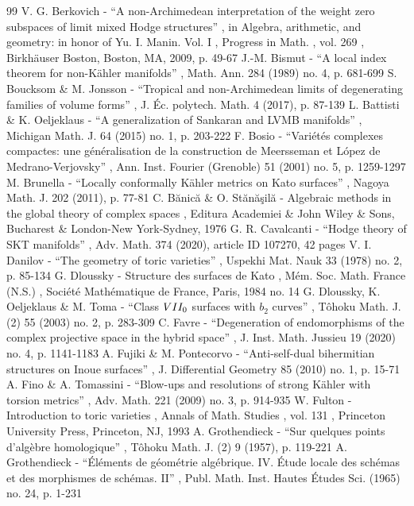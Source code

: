 \documentclass[11pt]{article}
\theoremstyle{definition}
\begin{document}
\begin{thebibliography}{99}
 V. G. Berkovich - “A non-Archimedean interpretation of the weight zero subspaces of limit mixed Hodge structures” , in Algebra, arithmetic, and geometry: in honor of Yu. I. Manin. Vol. I , Progress in Math. , vol. 269 , Birkhäuser Boston, Boston, MA, 2009, p. 49-67
 J.-M. Bismut - “A local index theorem for non-Kähler manifolds” , Math. Ann. 284 (1989) no. 4, p. 681-699
 S. Boucksom \& M. Jonsson - “Tropical and non-Archimedean limits of degenerating families of volume forms” , J. Éc. polytech. Math. 4 (2017), p. 87-139
 L. Battisti \& K. Oeljeklaus - “A generalization of Sankaran and LVMB manifolds” , Michigan Math. J. 64 (2015) no. 1, p. 203-222
 F. Bosio - “Variétés complexes compactes: une généralisation de la construction de Meersseman et López de Medrano-Verjovsky” , Ann. Inst. Fourier (Grenoble) 51 (2001) no. 5, p. 1259-1297
 M. Brunella - “Locally conformally Kähler metrics on Kato surfaces” , Nagoya Math. J. 202 (2011), p. 77-81
 C. Bănică \& O. Stănăşilă - Algebraic methods in the global theory of complex spaces , Editura Academiei \& John Wiley \& Sons, Bucharest \& London-New York-Sydney, 1976
 G. R. Cavalcanti - “Hodge theory of SKT manifolds” , Adv. Math. 374 (2020), article ID 107270, 42 pages
 V. I. Danilov - “The geometry of toric varieties” , Uspekhi Mat. Nauk 33 (1978) no. 2, p. 85-134
 G. Dloussky - Structure des surfaces de Kato , Mém. Soc. Math. France (N.S.) , Société Mathématique de France, Paris, 1984 no. 14
 G. Dloussky, K. Oeljeklaus \& M. Toma - “Class $\rm VII_0$ surfaces with $b_2$ curves” , Tôhoku Math. J. (2) 55 (2003) no. 2, p. 283-309
 C. Favre - “Degeneration of endomorphisms of the complex projective space in the hybrid space” , J. Inst. Math. Jussieu 19 (2020) no. 4, p. 1141-1183
 A. Fujiki \& M. Pontecorvo - “Anti-self-dual bihermitian structures on Inoue surfaces” , J. Differential Geometry 85 (2010) no. 1, p. 15-71
 A. Fino \& A. Tomassini - “Blow-ups and resolutions of strong Kähler with torsion metrics” , Adv. Math. 221 (2009) no. 3, p. 914-935
 W. Fulton - Introduction to toric varieties , Annals of Math. Studies , vol. 131 , Princeton University Press, Princeton, NJ, 1993
 A. Grothendieck - “Sur quelques points d’algèbre homologique” , Tôhoku Math. J. (2) 9 (1957), p. 119-221
 A. Grothendieck - “Éléments de géométrie algébrique. IV. Étude locale des schémas et des morphismes de schémas. II” , Publ. Math. Inst. Hautes Études Sci. (1965) no. 24, p. 1-231

\end{thebibliography}
\end{document}
